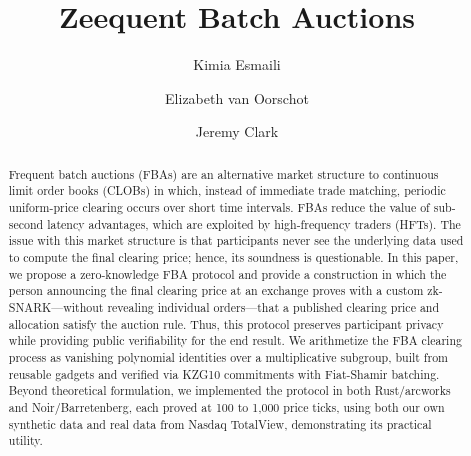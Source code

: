 \documentclass[runningheads]{llncs}
\begin{document}
\title{Zeequent Batch Auctions}

\author{Kimia Esmaili \and Elizabeth van Oorschot \and Jeremy Clark}

\maketitle

\begin{abstract}
Frequent batch auctions (FBAs) are an alternative market structure to continuous limit order books (CLOBs) in which, instead of immediate trade matching, periodic uniform-price clearing occurs over short time intervals. FBAs reduce the value of sub-second latency advantages, which are exploited by high-frequency traders (HFTs). The issue with this market structure is that participants never see the underlying data used to compute the final clearing price; hence, its soundness is questionable. In this paper, we propose a zero-knowledge FBA protocol and provide a construction in which the person announcing the final clearing price at an exchange proves with a custom zk-SNARK---without revealing individual orders---that a published clearing price and allocation satisfy the auction rule. Thus, this protocol preserves participant privacy while providing public verifiability for the end result. We arithmetize the FBA clearing process as vanishing polynomial identities over a multiplicative subgroup, built from reusable gadgets and verified via KZG10 commitments with Fiat-Shamir batching. Beyond theoretical formulation, we implemented the protocol in both Rust/arcworks and Noir/Barretenberg, each proved at 100 to 1,000 price ticks, using both our own synthetic data and real data from Nasdaq TotalView, demonstrating its practical utility.

\end{abstract}



% 
% 
% 
% 
% 




% 
\end{document}
